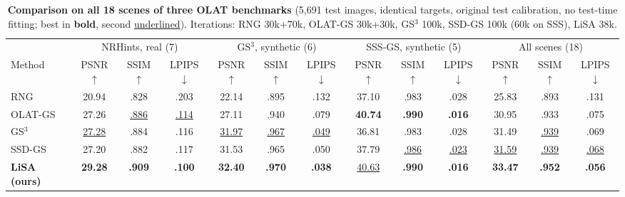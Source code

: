 \begin{table}[t]
\caption{\textbf{Comparison on all 18 scenes of three OLAT benchmarks} (5,691 test images, identical targets, original test calibration, no test-time fitting; best in \textbf{bold}, second \underline{underlined}). Iterations: RNG 30k+70k, OLAT-GS 30k+30k, GS$^3$ 100k, SSD-GS 100k (60k on SSS), LiSA 38k.}
\label{tab:main}
\centering\small
\setlength{\tabcolsep}{4.2pt}
\begin{tabular}{@{}l ccc ccc ccc ccc@{}}
\toprule
 & \multicolumn{3}{c}{NRHints, real (7)} & \multicolumn{3}{c}{GS$^3$, synthetic (6)} & \multicolumn{3}{c}{SSS-GS, synthetic (5)} & \multicolumn{3}{c}{All scenes (18)} \\
\cmidrule(lr){2-4}\cmidrule(lr){5-7}\cmidrule(lr){8-10}\cmidrule(l){11-13}
Method & PSNR$\uparrow$ & SSIM$\uparrow$ & LPIPS$\downarrow$ & PSNR$\uparrow$ & SSIM$\uparrow$ & LPIPS$\downarrow$ & PSNR$\uparrow$ & SSIM$\uparrow$ & LPIPS$\downarrow$ & PSNR$\uparrow$ & SSIM$\uparrow$ & LPIPS$\downarrow$ \\
\midrule
RNG~\cite{fan2025rng} & 20.94 & .828 & .203 & 22.14 & .895 & .132 & 37.10 & .983 & .028 & 25.83 & .893 & .131 \\
OLAT-GS~\cite{kuang2024olat} & 27.26 & \underline{.886} & \underline{.114} & 27.11 & .940 & .079 & \textbf{40.74} & \textbf{.990} & \textbf{.016} & 30.95 & .933 & .075 \\
GS$^3$~\cite{bi2024gs3} & \underline{27.28} & .884 & .116 & \underline{31.97} & \underline{.967} & \underline{.049} & 36.81 & .983 & .028 & 31.49 & \underline{.939} & .069 \\
SSD-GS~\cite{zheng2026ssdgs} & 27.20 & .882 & .117 & 31.53 & .965 & .050 & 37.79 & \underline{.986} & \underline{.023} & \underline{31.59} & \underline{.939} & \underline{.068} \\
\midrule
\textbf{LiSA (ours)} & \textbf{29.28} & \textbf{.909} & \textbf{.100} & \textbf{32.40} & \textbf{.970} & \textbf{.038} & \underline{40.63} & \textbf{.990} & \textbf{.016} & \textbf{33.47} & \textbf{.952} & \textbf{.056} \\
\bottomrule
\end{tabular}
\end{table}
